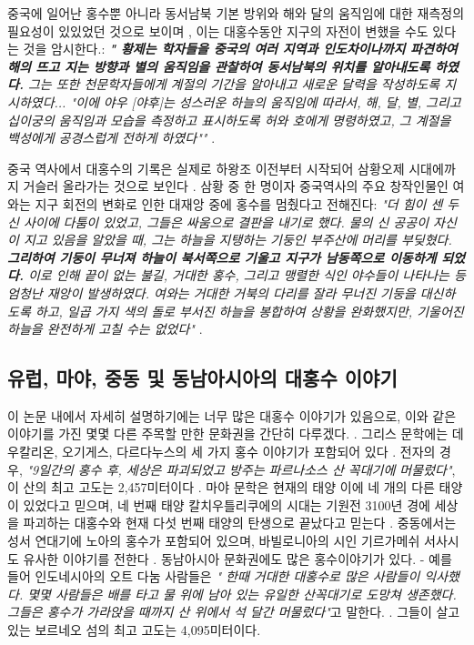 \documentclass[10pt,twocolumn,letterpaper]{article}
\begin{document}
중국에 일어난 홍수뿐 아니라 동서남북 기본 방위와 해와 달의 움직임에 대한 재측정의 필요성이 있있었던 것으로 보이며 , 이는 대홍수동안 지구의 자전이 변했을 수도 있다는 것을 암시한다.: \textit{\textbf{" 황제는 학자들을 중국의 여러 지역과 인도차이나까지 파견하여 해의 뜨고 지는 방향과 별의 움직임을 관찰하여 동서남북의 위치를 알아내도록 하였다.} 그는 또한 천문학자들에게 계절의 기간을 알아내고 새로운 달력을 작성하도록 지시하였다... "이에 야우 [야후]는 성스러운 하늘의 움직임에 따라서, 해, 달, 별, 그리고 십이궁의 움직임과 모습을 측정하고 표시하도록  허와 호에게 명령하였고, 그 계절을 백성에게 공경스럽게 전하게 하였다""} \cite{5}.

중국 역사에서 대홍수의 기록은 실제로 하왕조 이전부터 시작되어 삼황오제 시대에까지 거슬러 올라가는 것으로 보인다 \cite{7}. 삼황 중 한 명이자 중국역사의 주요 창작인물인 여와는 지구 회전의 변화로 인한 대재앙 중에 홍수를 멈췄다고 전해진다: \textit{"더 힘이 센 두 신 사이에 다툼이 있었고, 그들은 싸움으로 결판을 내기로 했다. 물의 신 공공이 자신이 지고 있음을 알았을 때, 그는 하늘을 지탱하는 기둥인 부주산에 머리를 부딪혔다. \textbf{ 그리하여 기둥이 무너져 하늘이 북서쪽으로 기울고 지구가 남동쪽으로 이동하게 되었다.} 이로 인해 끝이 없는 불길, 거대한 홍수, 그리고 맹렬한 식인 야수들이 나타나는 등 엄청난 재앙이 발생하였다. 여와는 거대한 거북의 다리를 잘라 무너진 기둥을 대신하도록 하고, 일곱 가지 색의 돌로 부서진 하늘을 봉합하여 상황을 완화했지만, 기울어진 하늘을 완전하게 고칠 수는 없었다"} \cite{8}.

\subsection{유럽, 마야, 중동 및 동남아시아의 대홍수 이야기}

이 논문 내에서 자세히 설명하기에는 너무 많은 대홍수 이야기가 있음으로, 이와 같은 이야기를 가진 몇몇 다른 주목할 만한 문화권을 간단히 다루겠다. . 그리스 문학에는 데우칼리온, 오기게스, 다르다누스의 세 가지 홍수 이야기가 포함되어 있다 \cite{9,10}. 전자의 경우, \textit{"9일간의 홍수 후, 세상은 파괴되었고 방주는 파르나소스 산 꼭대기에 머물렀다"}, 이 산의 최고 고도는 2,457미터이다 \cite{11}. 마야 문학은 현재의 태양 이에  네 개의 다른 태양이 있었다고 믿으며, 네 번째 태양 칼치우틀리쿠에의 시대는 기원전 3100년 경에 세상을 파괴하는 대홍수와 현재 다섯 번째 태양의 탄생으로 끝났다고 믿는다 \cite{12}. 중동에서는 성서 연대기에 노아의 홍수가 포함되어 있으며, 바빌로니아의 시인 기르가메쉬 서사시도 유사한 이야기를 전한다 \cite{13}. 동남아시아 문화권에도 많은 홍수이야기가 있다. - 예를 들어  인도네시아의 오트 다눔 사람들은  \textit{" 한때 거대한 대홍수로 많은 사람들이 익사했다. 몇몇 사람들은 배를 타고 물 위에 남아 있는 유일한 산꼭대기로 도망쳐 생존했다. 그들은 홍수가 가라앉을 때까지 산 위에서 석 달간 머물렀다"}고 말한다. \cite{3}. 그들이 살고 있는 보르네오 섬의 최고 고도는 4,095미터이다.
\end{document}
